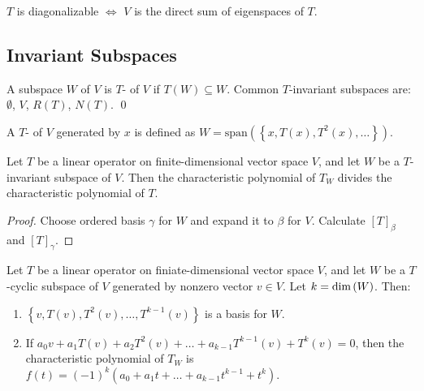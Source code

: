 \begin{theorem}
    $T$ is diagonalizable $\iff$ $V$ is the direct sum of eigenspaces of $T$.
\end{theorem}


\subsection{Invariant Subspaces}

\begin{definition}
    A subspace $W$ of $V$ is $T$- of $V$ if $T(W) \subseteq W$.
    Common $T$-invariant subspaces are: $\emptyset$, $V$, $R(T)$, $N(T)$.
    \qed
\end{definition}



\begin{definition}
    A $T$- of $V$ generated by $x$ is defined as $W=\text{span} \left( \left \{x, T(x), T^2(x), \dots \right \}\right)$.
\end{definition}

\begin{theorem}
    Let $T$ be a linear operator on finite-dimensional vector space $V$, and let $W$ be a $T$-invariant subspace of $V$. Then the characteristic polynomial of $T_W$ divides the characteristic polynomial of $T$.
\end{theorem}

\begin{proof}
    Choose ordered basis $\gamma$ for $W$ and expand it to $\beta$ for $V$. Calculate $[T]_\beta$ and $[T]_\gamma$.
\end{proof}


\begin{theorem}
    Let $T$ be a linear operator on finiate-dimensional vector space $V$, and let $W$ be a $T$-cyclic subspace of $V$ generated by nonzero vector $v \in V$. Let $k = \displaystyle \text{dim}\left( W \right)$. Then:
    \begin{enumerate}
        \item $\left\{ v, T(v), T^2(v), \dots, T^{k-1}(v) \right\}$ is a basis for $W$.
        \item If $a_0 v + a_1 T(v) + a_2 T^2(v) + \dots + a_{k-1} T^{k-1}(v) + T^k(v) = 0$, then the characteristic polynomial of $T_W$ is $f(t) = (-1)^k (a_0 + a_1 t + \dots + a_{k-1} t^{k-1} + t^k)$.
    \end{enumerate}
\end{theorem}

